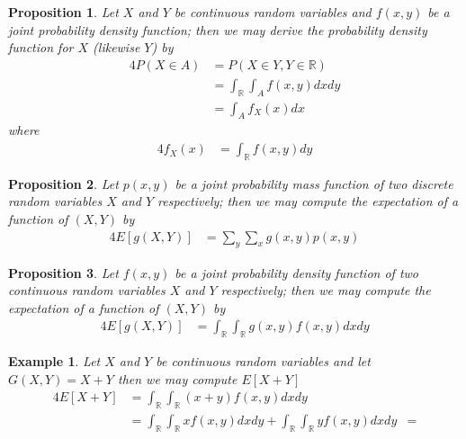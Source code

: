 \documentclass[11pt, oneside]{book}   	%
\newtheorem{example}{Example}[chapter]
\newtheorem{proposition}{Proposition}[chapter]
\newcommand{\paren}[1]{\left(#1\right)}
\begin{document}
\begin{proposition}
	Let $X$ and $Y$ be continuous random variables and $f(x, y)$ be a joint probability density function; then we may derive the probability density function for $X$ (likewise $Y$) by 
	\begin{alignat*}{4}
		P\paren{X\in A}&=P\paren{X\in Y, Y\in \mathbb{R}} \\
			&=\int_\mathbb{R}\int_Af(x, y)dx dy \\
			&=\int_A f_X(x)dx 
	\end{alignat*}
	where
	\begin{alignat}{4}
		f_X(x)&=\int_\mathbb{R}f(x, y)dy
	\end{alignat}
\end{proposition}

\begin{proposition}
	Let $p(x, y)$ be a joint probability mass function of two discrete random variables $X$ and $Y$ respectively; then we may compute the expectation of a function of $(X, Y)$ by 
	\begin{alignat}{4}
		E[g(X, Y)]&=\sum_y\sum_xg(x, y)p(x, y)
	\end{alignat}
\end{proposition}

\begin{proposition}
	Let $f(x, y)$ be a joint probability density function of two continuous random variables $X$ and $Y$ respectively; then we may compute the expectation of a function of $(X, Y)$ by 
	\begin{alignat}{4}
		E[g(X, Y)]&=\int_\mathbb{R}\int_\mathbb{R}g(x, y)f(x, y)dx dy
	\end{alignat}
\end{proposition}

\begin{example}
	Let $X$ and $Y$ be continuous random variables and let $G(X, Y)=X+Y$ then we may compute $E[X+Y]$
	\begin{alignat}{4}
		E[X+Y]&=\int_\mathbb{R}\int_\mathbb{R} (x+y)f(x, y)dxdy \\
			&=\int_\mathbb{R}\int_\mathbb{R} xf(x, y)dx dy + \int_\mathbb{R}\int_\mathbb{R} yf(x, y)dx dy
			&=
	\end{alignat}
\end{example}

\clearpage
{}
\printindex
\end{document}
